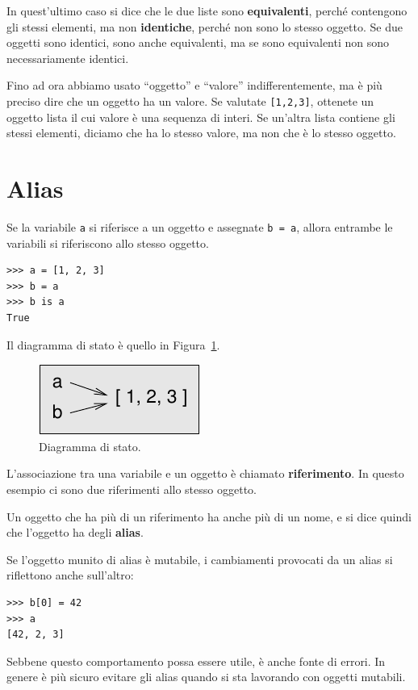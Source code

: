 \documentclass[10pt]{book}
\begin{document}
In quest'ultimo caso si dice che le due liste sono {\bf equivalenti},
perché contengono gli stessi elementi, ma non {\bf identiche}, perché non sono lo stesso oggetto.
Se due oggetti sono identici, sono anche equivalenti, ma se sono equivalenti non sono necessariamente identici.

Fino ad ora abbiamo usato ``oggetto'' e ``valore'' indifferentemente, ma è più preciso dire che un oggetto ha un valore.  Se valutate {\tt [1,2,3]}, ottenete un oggetto lista il cui valore è una sequenza di interi. Se un'altra lista contiene gli stessi elementi, diciamo che ha lo stesso valore, ma non che è lo stesso oggetto.


\section{Alias}

Se la variabile {\tt a} si riferisce a un oggetto e assegnate {\tt b = a},
allora entrambe le variabili si riferiscono allo stesso oggetto.

\begin{verbatim}
>>> a = [1, 2, 3]
>>> b = a
>>> b is a
True
\end{verbatim}
%
Il diagramma di stato è quello in Figura~\ref{fig.list3}.

\begin{figure}
\centerline
{\includegraphics[scale=0.8]{figs/list3.pdf}}
\caption{Diagramma di stato.}
\label{fig.list3}
\end{figure}

L'associazione tra una variabile e un oggetto è chiamato {\bf
riferimento}. In questo esempio ci sono due riferimenti allo stesso oggetto.

Un oggetto che ha più di un riferimento ha anche più di un nome, e si dice quindi che l'oggetto ha degli {\bf alias}.

Se l'oggetto munito di alias è mutabile, i cambiamenti provocati da un alias si riflettono anche sull'altro:

\begin{verbatim}
>>> b[0] = 42
>>> a
[42, 2, 3]
\end{verbatim}
%
Sebbene questo comportamento possa essere utile, è anche fonte di errori. In genere è più sicuro evitare gli alias quando si sta lavorando con oggetti mutabili.
\end{document}
